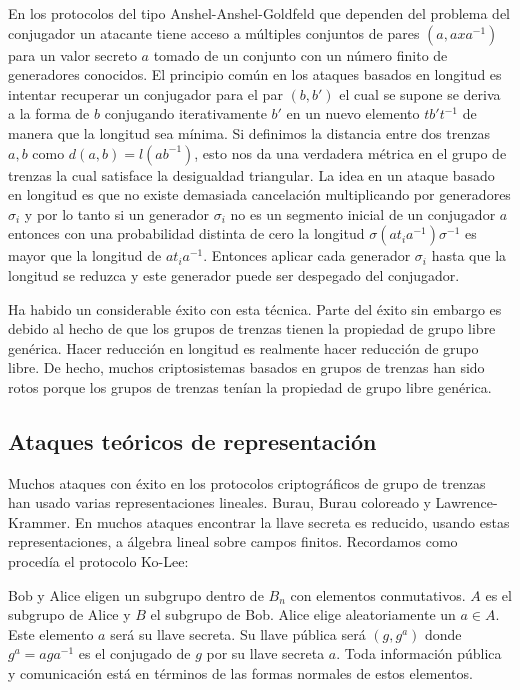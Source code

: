 \documentclass[12pt]{book}
\theoremstyle{definition}
\begin{document}
En los protocolos del tipo Anshel-Anshel-Goldfeld que dependen del problema del conjugador un atacante tiene acceso a múltiples conjuntos de pares $(a,axa^{-1})$ para un valor secreto $a$ tomado de un conjunto con un número finito de generadores conocidos. El principio común en los ataques basados en longitud es intentar recuperar un conjugador para el par $(b,b')$ el cual se supone se deriva a la forma de $b$ conjugando iterativamente $b'$ en un nuevo elemento $tb't^{-1}$ de manera que la longitud sea mínima. Si definimos la distancia entre dos trenzas $a,b$ como $d(a,b)=l(ab^{-1})$, esto nos da una verdadera métrica en el grupo de trenzas la cual satisface la desigualdad triangular. La idea en un ataque basado en longitud es que no existe demasiada cancelación multiplicando por generadores $\sigma_i$ y por lo tanto si un generador $\sigma_i$ no es un segmento inicial de un conjugador $a$ entonces con una probabilidad distinta de cero la longitud $\sigma(at_ia^{-1})\sigma^{-1}$ es mayor que la longitud de $at_ia^{-1}$. Entonces aplicar cada generador $\sigma_i$ hasta que la longitud se reduzca y este generador puede ser despegado del conjugador.

Ha habido un considerable éxito con esta técnica. Parte del éxito sin embargo es debido al hecho de que los grupos de trenzas tienen la propiedad de grupo libre genérica. Hacer reducción en longitud es realmente hacer reducción de grupo libre. De hecho, muchos criptosistemas basados en grupos de trenzas han sido rotos porque los grupos de trenzas tenían la propiedad de grupo libre genérica.

\subsection{Ataques teóricos de representación}
Muchos ataques con éxito en los protocolos criptográficos de grupo de trenzas han usado varias representaciones lineales. Burau, Burau coloreado y Lawrence-Krammer. En muchos ataques encontrar la llave secreta es reducido, usando estas representaciones, a álgebra lineal sobre campos finitos. Recordamos como procedía el protocolo Ko-Lee:

Bob y Alice eligen un subgrupo dentro de $B_n$ con elementos conmutativos. $A$ es el subgrupo de Alice y $B$ el subgrupo de Bob. Alice elige aleatoriamente un $a\in A$. Este elemento $a$ será su llave secreta. Su llave pública será $(g,g^a)$ donde $g^a=aga^{-1}$ es el conjugado de $g$ por su llave secreta $a$. Toda información pública y comunicación está en términos de las formas normales de estos elementos.
\end{document}
